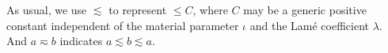 \documentclass[10pt]{amsart}
\newtheorem{lemma}[theorem]{Lemma}
\renewcommand{\div}{\operatorname{div}}
\numberwithin{equation}{section}
\begin{document}
As usual, we use $\lesssim$ to represent $\leq C$, where $C$ may be a generic positive constant independent of %
the material parameter $\iota$ and the Lam\'e coefficient $\lambda$. And $a\eqsim b$ indicates $a\lesssim b\lesssim a$. 



\end{document}
